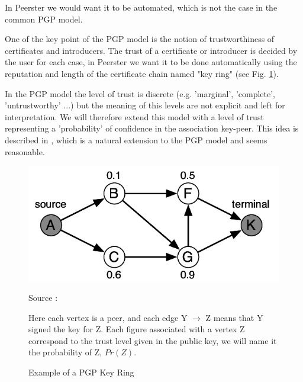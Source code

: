 \documentclass[]{article}
\begin{document}
In Peerster we would want it to be automated, which is not the case in the common PGP model. 

One of the key point of the PGP model is the notion of trustworthiness of certificates and introducers. The trust of a certificate or introducer is decided by the user for each case, in Peerster we want it to be done automatically using the reputation and length of the certificate chain named "key ring" (see Fig. \ref{fig:pgp-key-ring}).

In the PGP model the level of trust is discrete (e.g. 'marginal', 'complete', 'untrustworthy' ...) but the meaning of this levels are not explicit and left for interpretation. We will therefore extend this model with a level of trust representing a 'probability' of confidence in the association key-peer. This idea is described in \cite{haenni2007new}, which is a natural extension to the PGP model and seems reasonable.

\begin{figure}[h]
\includegraphics{pgp-key-ring}
\centering
\caption{Example of a PGP Key Ring}
\label{fig:pgp-key-ring}
Source : \cite{haenni2007new}

Here each vertex is a peer, and each edge Y $\rightarrow$ Z means that Y signed the key for Z.
Each figure associated with a vertex Z  correspond to the trust level given in the public key, we will name it the probability of Z, $Pr(Z)$.
\end{figure}
\end{document}
